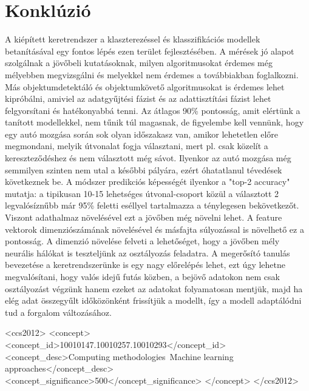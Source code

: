 \documentclass[acmtog, authorversion]{acmart}
\begin{document}
\section{Konklúzió}
A kiépített keretrendszer a klaszterezéssel és klasszifikációs modellek betanításával egy fontos lépés ezen terület fejlesztésében. A mérések jó alapot szolgálnak a jövőbeli kutatásoknak, milyen algoritmusokat érdemes még mélyebben megvizsgálni és melyekkel nem érdemes a továbbiakban foglalkozni. Más objektumdetektáló és objektumkövető algoritmusokat is érdemes lehet kipróbálni, amiviel az adatgyűjtési fázist és az adattisztítási fázist lehet felgyorsítani és hatékonyabbá tenni.
Az átlagos 90\% pontosság, amit elértünk a tanított modellekkel, nem tűnik túl magasnak, de figyelembe kell vennünk, hogy egy autó mozgása során sok olyan időszakasz van, amikor lehetetlen előre megmondani, melyik útvonalat fogja választani, mert pl. csak közelít a kereszteződéshez és nem választott még sávot. Ilyenkor az autó mozgása még semmilyen szinten nem utal a későbbi pályára, ezért óhatatlanul tévedések következnek be. A módszer predikciós képességét ilyenkor a "top-2 accuracy" mutatja: a tipikusan 10-15 lehetséges útvonal-csoport közül a választott 2 legvalósíznűbb már 95\% feletti eséllyel tartalmazza a ténylegesen bekövetkezőt. 
Viszont adathalmaz növelésével ezt a jövőben még növelni lehet. A feature vektorok dimenziószámának növelésével és másfajta súlyozással is növelhető ez a pontosság. A dimenzió növelése felveti a lehetőséget, hogy a jövőben mély neurális hálókat is teszteljünk az osztályozás feladatra.
A megerősító tanulás bevezetése a keretrendszerünke is egy nagy előrelépés lehet, ezt úgy lehetne megvalósítani, hogy valós idejű futás közben, a bejövő adatokon nem csak osztályozást végzünk hanem ezeket az adatokat folyamatosan mentjük, majd ha elég adat összegyűlt időközönként frissítjük a modellt, így a modell adaptálódni tud a forgalom változásához. 




\begin{CCSXML}
    <ccs2012>
        <concept>
            <concept_id>10010147.10010257.10010293</concept_id>
            <concept_desc>Computing methodologies~Machine learning approaches</concept_desc>
            <concept_significance>500</concept_significance>
            </concept>
    </ccs2012>
\end{CCSXML}
\end{document}
